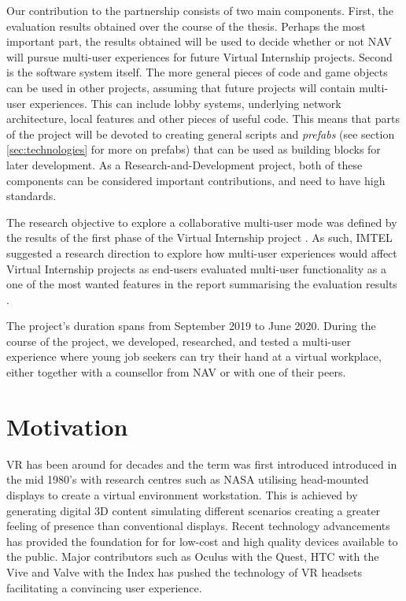 
Our contribution to the partnership consists of two main components. First, the evaluation results obtained over the course of the thesis. Perhaps the most important part, the results obtained will be used to decide whether or not NAV will pursue multi-user experiences for future Virtual Internship projects. Second is the software system itself. The more general pieces of code and game objects can be used in other projects, assuming that future projects will contain multi-user experiences. This can include lobby systems, underlying network architecture, local features and other pieces of useful code. This means that parts of the project will be devoted to creating general scripts and \textit{prefabs} (see section \ref{sec:technologies} for more on prefabs) that can be used as building blocks for later development. As a Research-and-Development project, both of these components can be considered important contributions, and need to have high standards.


The research objective to explore a collaborative multi-user mode was defined by the results of the first phase of the Virtual Internship project \cite{NavVRrapport}. As such, IMTEL suggested a research direction to explore how multi-user experiences would affect Virtual Internship projects as end-users evaluated multi-user functionality as a one of the most wanted features in the report summarising the evaluation results \cite{NavVRrapport}.    




The project's duration spans from September 2019 to June 2020. During the course of the project, we developed, researched, and tested a multi-user experience where young job seekers can try their hand at a virtual workplace, either together with a counsellor from NAV or with one of their peers.

\section{Motivation}
VR has been around for decades and the term was first introduced introduced in the mid 1980's \cite{historyVR} with research centres such as NASA utilising head-mounted displays to create a virtual environment workstation. This is achieved by generating digital 3D content simulating different scenarios creating a greater feeling of presence than conventional displays. Recent technology advancements has provided the foundation for for low-cost and high quality devices available to the public. Major contributors such as Oculus with the Quest, HTC with the Vive and Valve with the Index has pushed the technology of VR headsets facilitating a convincing user experience.  

